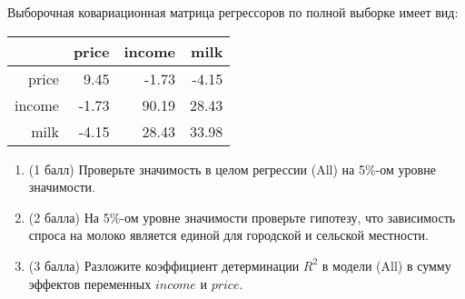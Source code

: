 \begin{enumerate}
Выборочная ковариационная матрица регрессоров по полной выборке имеет вид:

\begin{tabular}{rrrr}
  \hline
 & price & income & milk \\ 
  \hline
price & 9.45 & -1.73 & -4.15 \\ 
  income & -1.73 & 90.19 & 28.43 \\ 
  milk & -4.15 & 28.43 & 33.98 \\ 
   \hline
\end{tabular}



\begin{enumerate}
\item (1 балл) Проверьте значимость в целом регрессии (All) на 5\%-ом уровне значимости.
\item (2 балла) На 5\%-ом уровне значимости проверьте гипотезу, что зависимость спроса на молоко является единой для городской и сельской местности.
\item (3 балла) Разложите коэффициент детерминации $R^2$ в модели (All) в сумму эффектов переменных $income$ и $price$.
\end{enumerate}



\end{enumerate}
